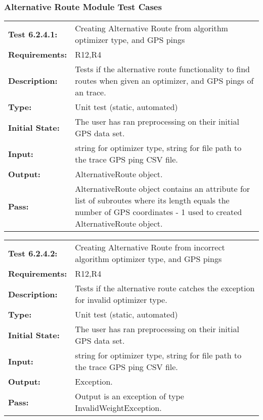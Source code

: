\documentclass[12pt, titlepage]{article}
\begin{document}
{\subsubsection{Alternative Route Module Test Cases}
\begin{tabular}{|l|p{10cm}|}
    \hline
    \bf{Test} 6.2.4.1: & Creating Alternative Route from algorithm optimizer type, and GPS pings \\
    \bf{Requirements}: & R12,R4 \\
    \bf{Description}: & Tests if the alternative route functionality to find routes when given an optimizer, and GPS pings of an trace. \\
    \bf{Type}: & Unit test (static, automated) \\
    \bf{Initial State}: & The user has ran preprocessing on their initial GPS data set. \\
    \bf{Input}: & string for optimizer type, string for file path to the trace GPS ping CSV file. \\
    \bf{Output}: & AlternativeRoute object. \\
    \bf{Pass}: & AlternativeRoute object contains an attribute for list of subroutes where its length equals the number of GPS coordinates - 1 used to created AlternativeRoute object. \\
    \hline
\end{tabular}
\begin{tabular}{|l|p{10cm}|}
    \hline
    \bf{Test} 6.2.4.2: & Creating Alternative Route from incorrect algorithm optimizer type, and GPS pings \\
    \bf{Requirements}: & R12,R4 \\
    \bf{Description}: & Tests if the alternative route catches the exception for invalid optimizer type. \\
    \bf{Type}: & Unit test (static, automated) \\
    \bf{Initial State}: & The user has ran preprocessing on their initial GPS data set. \\
    \bf{Input}: & string for optimizer type, string for file path to the trace GPS ping CSV file. \\
    \bf{Output}: & Exception. \\
    \bf{Pass}: & Output is an exception of type InvalidWeightException. \\
    \hline
\end{tabular}
}
\end{document}
